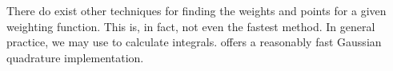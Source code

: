 
There do exist other techniques for finding the weights and points for a given weighting function.
This is, in fact, not even the fastest method.
In general practice, we may use  to calculate integrals.
 offers a reasonably fast Gaussian quadrature implementation.
